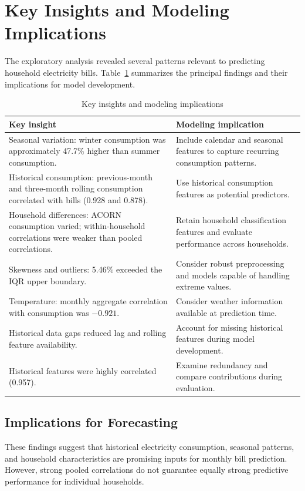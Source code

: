 \documentclass[11pt,a4paper]{article}
\begin{document}
\section{Key Insights and Modeling Implications}
The exploratory analysis revealed several patterns relevant to predicting household electricity bills. Table~\ref{tab:insights} summarizes the principal findings and their implications for model development.
\begin{table}[H]\centering\caption{Key insights and modeling implications}\label{tab:insights}\footnotesize
\begin{tabular}{@{}p{.44\linewidth}p{.48\linewidth}@{}}\toprule
Key insight & Modeling implication\\\midrule
Seasonal variation: winter consumption was approximately 47.7\% higher than summer consumption. & Include calendar and seasonal features to capture recurring consumption patterns.\\
Historical consumption: previous-month and three-month rolling consumption correlated with bills (0.928 and 0.878). & Use historical consumption features as potential predictors.\\
Household differences: ACORN consumption varied; within-household correlations were weaker than pooled correlations. & Retain household classification features and evaluate performance across households.\\
Skewness and outliers: 5.46\% exceeded the IQR upper boundary. & Consider robust preprocessing and models capable of handling extreme values.\\
Temperature: monthly aggregate correlation with consumption was $-0.921$. & Consider weather information available at prediction time.\\
Historical data gaps reduced lag and rolling feature availability. & Account for missing historical features during model development.\\
Historical features were highly correlated (0.957). & Examine redundancy and compare contributions during evaluation.\\\bottomrule
\end{tabular}\end{table}
\subsection{Implications for Forecasting}
These findings suggest that historical electricity consumption, seasonal patterns, and household characteristics are promising inputs for monthly bill prediction. However, strong pooled correlations do not guarantee equally strong predictive performance for individual households.
\end{document}
